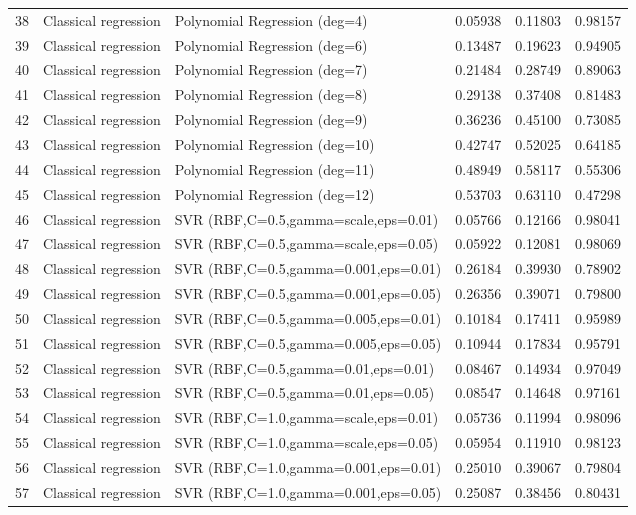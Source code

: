 \documentclass[10pt]{article}
\begin{document}
\begin{longtable}{C{0.75cm}L{2.35cm}L{8.0cm}C{1.15cm}C{1.15cm}C{1.15cm}}
38 & Classical regression & Polynomial Regression (deg=4) & 0.05938 & 0.11803 & 0.98157 \\
39 & Classical regression & Polynomial Regression (deg=6) & 0.13487 & 0.19623 & 0.94905 \\
40 & Classical regression & Polynomial Regression (deg=7) & 0.21484 & 0.28749 & 0.89063 \\
41 & Classical regression & Polynomial Regression (deg=8) & 0.29138 & 0.37408 & 0.81483 \\
42 & Classical regression & Polynomial Regression (deg=9) & 0.36236 & 0.45100 & 0.73085 \\
43 & Classical regression & Polynomial Regression (deg=10) & 0.42747 & 0.52025 & 0.64185 \\
44 & Classical regression & Polynomial Regression (deg=11) & 0.48949 & 0.58117 & 0.55306 \\
45 & Classical regression & Polynomial Regression (deg=12) & 0.53703 & 0.63110 & 0.47298 \\
46 & Classical regression & SVR (RBF,C=0.5,gamma=scale,eps=0.01) & 0.05766 & 0.12166 & 0.98041 \\
47 & Classical regression & SVR (RBF,C=0.5,gamma=scale,eps=0.05) & 0.05922 & 0.12081 & 0.98069 \\
48 & Classical regression & SVR (RBF,C=0.5,gamma=0.001,eps=0.01) & 0.26184 & 0.39930 & 0.78902 \\
49 & Classical regression & SVR (RBF,C=0.5,gamma=0.001,eps=0.05) & 0.26356 & 0.39071 & 0.79800 \\
50 & Classical regression & SVR (RBF,C=0.5,gamma=0.005,eps=0.01) & 0.10184 & 0.17411 & 0.95989 \\
51 & Classical regression & SVR (RBF,C=0.5,gamma=0.005,eps=0.05) & 0.10944 & 0.17834 & 0.95791 \\
52 & Classical regression & SVR (RBF,C=0.5,gamma=0.01,eps=0.01) & 0.08467 & 0.14934 & 0.97049 \\
53 & Classical regression & SVR (RBF,C=0.5,gamma=0.01,eps=0.05) & 0.08547 & 0.14648 & 0.97161 \\
54 & Classical regression & SVR (RBF,C=1.0,gamma=scale,eps=0.01) & 0.05736 & 0.11994 & 0.98096 \\
55 & Classical regression & SVR (RBF,C=1.0,gamma=scale,eps=0.05) & 0.05954 & 0.11910 & 0.98123 \\
56 & Classical regression & SVR (RBF,C=1.0,gamma=0.001,eps=0.01) & 0.25010 & 0.39067 & 0.79804 \\
57 & Classical regression & SVR (RBF,C=1.0,gamma=0.001,eps=0.05) & 0.25087 & 0.38456 & 0.80431 \\

\end{longtable}
\end{document}
